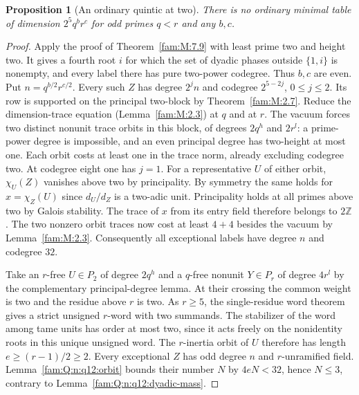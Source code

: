 \documentclass[11pt,a4paper]{article}
\numberwithin{equation}{section}
\newtheorem{proposition}[theorem]{Proposition}
\theoremstyle{remark}
\begin{document}
\begin{proposition}[An ordinary quintic at two]\label{fam:Q:5.8}\label{fam:Q:n:q12:ordinary-five}
There is no ordinary minimal table of dimension $2^5q^b r^c$
for odd primes $q<r$ and any $b,c$.
\end{proposition}
\begin{proof}
Apply the proof of Theorem~\ref{fam:M:7.9} with least prime two
and height two. It gives a fourth root $i$ for which the set
of dyadic phases outside $\{1,i\}$ is nonempty, and every label
there has pure two-power codegree. Thus $b,c$ are even. Put
$n=q^{b/2}r^{c/2}$. Every such $Z$ has degree $2^j n$ and
codegree $2^{5-2j}$, $0\le j\le2$. Its row is supported on the
principal two-block by Theorem~\ref{fam:M:2.7}.
Reduce the dimension-trace equation (Lemma~\ref{fam:M:2.3}) at
$q$ and at $r$. The vacuum forces two distinct nonunit trace orbits
in this block, of degrees $2q^h$ and $2r^l$: a prime-power
degree is impossible, and an even principal degree has two-height
at most one. Each orbit costs at least one in the trace norm,
already excluding codegree two. At codegree eight one has $j=1$.
For a representative $U$ of either orbit, $\chi_U(Z)$ vanishes above
two by principality. By symmetry the same holds for
$x=\chi_Z(U)$ since $d_U/d_Z$ is a two-adic unit. Principality
holds at all primes above two by Galois stability. The trace of
$x$ from its entry field therefore belongs to $2\mathbb Z$.
The two nonzero orbit traces now cost at least $4+4$ besides the
vacuum by Lemma~\ref{fam:M:2.3}. Consequently all exceptional
labels have degree $n$ and codegree $32$.

Take an $r$-free $U\in P_2$ of degree $2q^h$ and a $q$-free
nonunit $Y\in P_r$ of degree $4r^l$ by the complementary
principal-degree lemma. At their crossing the common weight is
two and the residue above $r$ is two. As $r\ge5$, the single-residue
word theorem gives a strict unsigned $r$-word with two summands.
The stabilizer of the word among tame units has order at most two,
since it acts freely on the nonidentity roots in this unique
unsigned word. The $r$-inertia orbit of $U$ therefore has length
$e\ge(r-1)/2\ge2$. Every exceptional $Z$ has odd degree $n$ and
$r$-unramified field. Lemma~\ref{fam:Q:n:q12:orbit} bounds their number
$N$ by $4eN<32$, hence $N\le3$, contrary to
Lemma~\ref{fam:Q:n:q12:dyadic-mass}.
\end{proof}
\end{document}
